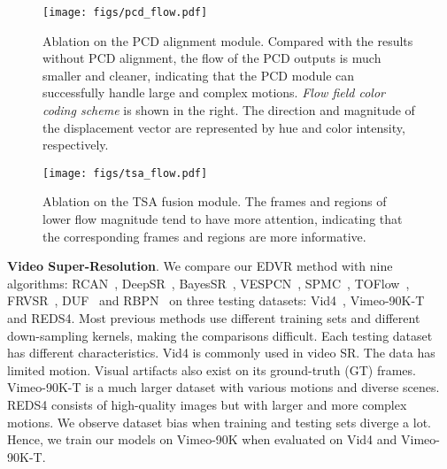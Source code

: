 \documentclass[10pt,twocolumn,letterpaper]{article}
\begin{document}
\begin{figure*}[!th]
	\vspace{-0.4cm}
	\begin{center}
		\texttt{[image: figs/pcd\_flow.pdf]}
		\vspace{-0.6cm}
		\caption{Ablation on the PCD alignment module. Compared with the results without PCD alignment, the flow of the PCD outputs is much smaller and cleaner, indicating that the PCD module can successfully handle large and complex motions. \textit{Flow field color coding scheme} is shown in the right. The direction and magnitude of the displacement vector are represented by hue and color intensity, respectively.}
\label{fig:pcd_flow}
	\end{center}
	\vspace{-0.3cm}
\end{figure*}
\begin{figure*}[!th]
	\vspace{-0.4cm}
	\begin{center}
		\texttt{[image: figs/tsa\_flow.pdf]}
		\vspace{-0.6cm}
		\caption{Ablation on the TSA fusion module. The frames and regions of lower flow magnitude tend to have more attention, indicating that the corresponding frames and regions are more informative.}
		\label{fig:tsa_flow}
	\end{center}
	\vspace{-0.9cm}
\end{figure*}


\noindent\textbf{Video Super-Resolution}.
We compare our EDVR method with nine algorithms: RCAN~\cite{zhang2018image}, DeepSR~\cite{liao2015video}, BayesSR~\cite{liu2014bayesian}, VESPCN~\cite{caballero2017real}, SPMC~\cite{tao2017detail}, TOFlow~\cite{xue2017video}, FRVSR~\cite{sajjadi2018frame}, DUF~\cite{jo2018deep} and RBPN~\cite{haris2019recurrent} on three testing datasets: Vid4~\cite{liu2014bayesian}, Vimeo-90K-T~\cite{xue2017video} and REDS4.
Most previous methods use different training sets and different down-sampling kernels, making the comparisons difficult.
Each testing dataset has different characteristics.
Vid4 is commonly used in video SR. The data has limited motion. Visual artifacts also exist on its ground-truth (GT) frames.
Vimeo-90K-T is a much larger dataset with various motions and diverse scenes. REDS4 consists of high-quality images but with larger and more complex motions.
We observe dataset bias when training and testing sets diverge a lot. Hence, we train our models on Vimeo-90K when evaluated on Vid4 and Vimeo-90K-T.
\end{document}
